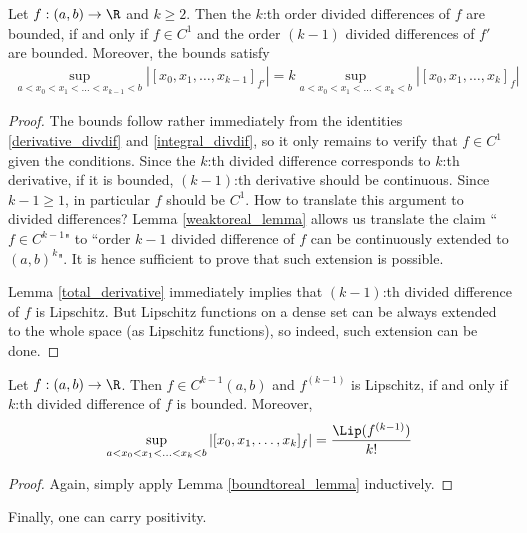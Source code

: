 \begin{lem}\label{boundtoreal_lemma}
	Let $f : (a, b) \to \R$ and $k \geq 2$. Then the $k$:th order divided differences of $f$ are bounded, if and only if $f \in C^{1}$ and the order $(k - 1)$ divided differences of $f'$ are bounded. Moreover, the bounds satisfy
	\begin{align*}
		\sup_{a < x_{0} < x_{1} < \ldots < x_{k - 1} < b} |[x_{0}, x_{1}, \ldots, x_{k - 1}]_{f'}| = k \sup_{a < x_{0} < x_{1} < \ldots < x_{k}< b} |[x_{0}, x_{1}, \ldots, x_{k}]_{f}|
	\end{align*}
\end{lem}
\begin{proof}
	The bounds follow rather immediately from the identities \ref{derivative_divdif} and \ref{integral_divdif}, so it only remains to verify that $f \in C^{1}$ given the conditions. Since the $k$:th divided difference corresponds to $k$:th derivative, if it is bounded, $(k - 1)$:th derivative should be continuous. Since $k - 1 \geq 1$, in particular $f$ should be $C^{1}$. How to translate this argument to divided differences? Lemma \ref{weaktoreal_lemma} allows us translate the claim ``$f \in C^{k - 1}$" to ``order $k - 1$ divided difference of $f$ can be continuously extended to $(a, b)^{k}$". It is hence sufficient to prove that such extension is possible.

	Lemma \ref{total_derivative} immediately implies that $(k - 1)$:th divided difference of $f$ is Lipschitz. But Lipschitz functions on a dense set can be always extended to the whole space (as Lipschitz functions), so indeed, such extension can be done.
\end{proof}

\begin{lause}\label{bounded_div}
	Let $f : (a, b) \to \R$. Then $f \in C^{k - 1}(a, b)$ and $f^{(k - 1)}$ is Lipschitz, if and only if $k$:th divided difference of $f$ is bounded. Moreover,
	\begin{align*}
		\sup_{a < x_{0} < x_{1} < \ldots < x_{k}< b} |[x_{0}, x_{1}, \ldots, x_{k}]_{f}| = \frac{\Lip(f^{(k - 1)})}{k!}
	\end{align*}
\end{lause}
\begin{proof}
	Again, simply apply Lemma \ref{boundtoreal_lemma} inductively.
\end{proof}

Finally, one can carry positivity.

